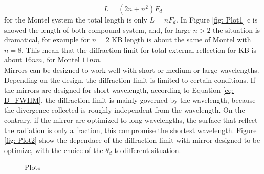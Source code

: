 \begin{equation}
L= (2 n + n^2 ) F_d
\label{eq: clearance distance}
\end{equation}
\noindent for the Montel system the total length is only $L = n F_d $. In Figure \ref{fig: Plot1} c is showed the length of both compound system, and, for large  $n>2 $ the situation is dramatical, for example for $n=2 $ KB length is about the same of Montel with $n=8 $. This mean that the diffraction limit for total external reflection for KB is about $16 nm$, for Montel $11 nm$.
\\
Mirrors can be designed to work well with short or medium or large wavelengths. Depending on the design, the diffraction  limit is limited to certain conditions. If the mirrors are designed for short wavelength, according to Equation \ref{eq: D_FWHM}, the diffraction limit is mainly governed by the wavelength, because the divergence collected is roughly independent from the wavelength. On the contrary, if the mirror are optimized to long wavelengths, the surface that reflect the radiation is only a fraction, this compromise the shortest wavelength. Figure \ref{fig: Plot2} show the dependace of the diffraction limit with mirror designed to be optimize, with the choice of the $\theta_d $ to different situation.
%
\begin{figure}[]
%
\centering
%
%
%
\caption{Plots}
\label{fig :Plots}
%
\end{figure}
%
